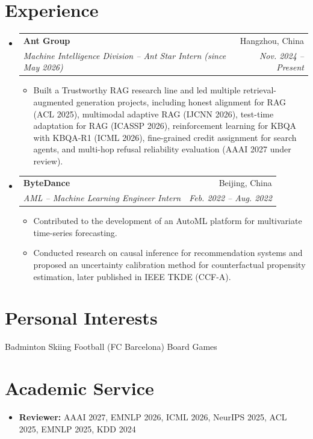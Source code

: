 \documentclass[letterpaper,11pt]{article}
\makeatletter
\newcommand{\resumeItem}[1]{
  \item\small{#1 \vspace{-2pt}}
}
\newcommand{\resumeSubheading}[4]{
  \vspace{-2pt}\item
    \begin{tabular*}{0.97\textwidth}[t]{l@{\extracolsep{\fill}}r}
      \textbf{#1} & #2 \\
      \textit{\small#3} & \textit{\small #4} \\
    \end{tabular*}\vspace{-7pt}
}
\newcommand{\resumeSubHeadingListStart}{\begin{itemize}[leftmargin=0.15in, label={}]}
\newcommand{\resumeSubHeadingListEnd}{\end{itemize}}
\newcommand{\resumeItemListStart}{\begin{itemize}[leftmargin=0.2in]}
\newcommand{\resumeItemListEnd}{\end{itemize}\vspace{-5pt}}
\makeatother
\begin{document}
\section{Experience}
  \resumeSubHeadingListStart
    \resumeSubheading
      {Ant Group}{Hangzhou, China}
      {Machine Intelligence Division -- Ant Star Intern (since May 2026)}{Nov. 2024 -- Present}
      \resumeItemListStart
        \resumeItem{Built a Trustworthy RAG research line and led multiple retrieval-augmented generation projects, including honest alignment for RAG (ACL 2025), multimodal adaptive RAG (IJCNN 2026), test-time adaptation for RAG (ICASSP 2026), reinforcement learning for KBQA with KBQA-R1 (ICML 2026), fine-grained credit assignment for search agents, and multi-hop refusal reliability evaluation (AAAI 2027 under review).}
      \resumeItemListEnd

    \resumeSubheading
      {ByteDance}{Beijing, China}
      {AML -- Machine Learning Engineer Intern}{Feb. 2022 -- Aug. 2022}
      \resumeItemListStart
        \resumeItem{Contributed to the development of an AutoML platform for multivariate time-series forecasting.}
        \resumeItem{Conducted research on causal inference for recommendation systems and proposed an uncertainty calibration method for counterfactual propensity estimation, later published in IEEE TKDE (CCF-A).}
      \resumeItemListEnd
  \resumeSubHeadingListEnd

\section{Personal Interests}
Badminton \quad Skiing \quad Football (FC Barcelona) \quad Board Games

\section{Academic Service}
\begin{itemize}[leftmargin=0.15in, label={}, nosep]
  \item \textbf{Reviewer:} AAAI 2027, EMNLP 2026, ICML 2026, NeurIPS 2025, ACL 2025, EMNLP 2025, KDD 2024
\end{itemize}

\end{document}
